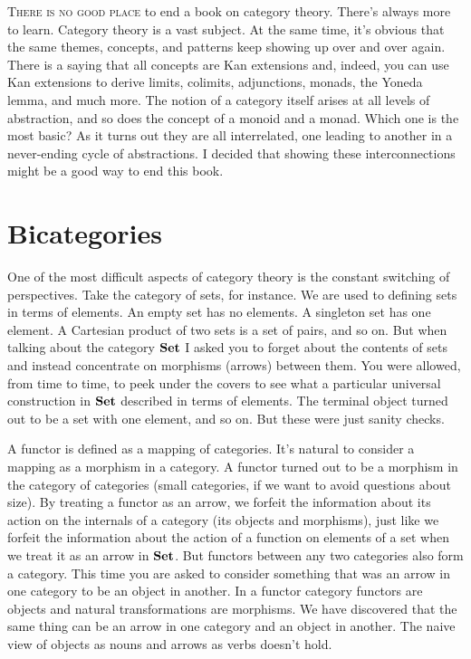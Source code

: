 
\lettrine[lhang=0.17]{T}{here is no good place} to end a book on category theory. There's always
more to learn. Category theory is a vast subject. At the same time, it's
obvious that the same themes, concepts, and patterns keep showing up
over and over again. There is a saying that all concepts are Kan
extensions and, indeed, you can use Kan extensions to derive limits,
colimits, adjunctions, monads, the Yoneda lemma, and much more. The
notion of a category itself arises at all levels of abstraction, and so
does the concept of a monoid and a monad. Which one is the most basic?
As it turns out they are all interrelated, one leading to another in a
never-ending cycle of abstractions. I decided that showing these
interconnections might be a good way to end this book.

\section{Bicategories}

One of the most difficult aspects of category theory is the constant
switching of perspectives. Take the category of sets, for instance. We
are used to defining sets in terms of elements. An empty set has no
elements. A singleton set has one element. A Cartesian product of two
sets is a set of pairs, and so on. But when talking about the category
$\mathbf{Set}$ I asked you to forget about the contents of sets and
instead concentrate on morphisms (arrows) between them. You were
allowed, from time to time, to peek under the covers to see what a
particular universal construction in $\mathbf{Set}$ described in terms of
elements. The terminal object turned out to be a set with one element,
and so on. But these were just sanity checks.

A functor is defined as a mapping of categories. It's natural to
consider a mapping as a morphism in a category. A functor turned out to
be a morphism in the category of categories (small categories, if we
want to avoid questions about size). By treating a functor as an arrow,
we forfeit the information about its action on the internals of a
category (its objects and morphisms), just like we forfeit the
information about the action of a function on elements of a set when we
treat it as an arrow in $\mathbf{Set}$. But functors between any two
categories also form a category. This time you are asked to consider
something that was an arrow in one category to be an object in another.
In a functor category functors are objects and natural transformations
are morphisms. We have discovered that the same thing can be an arrow in
one category and an object in another. The naive view of objects as
nouns and arrows as verbs doesn't hold.

